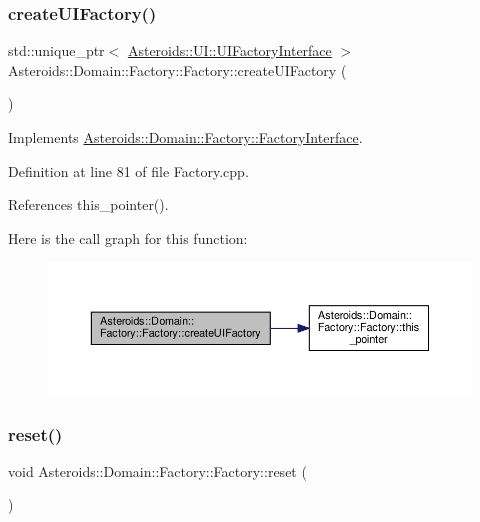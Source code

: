 \subsubsection{\texorpdfstring{create\+U\+I\+Factory()}{createUIFactory()}}
{\footnotesize\ttfamily std\+::unique\+\_\+ptr$<$ \hyperlink{classAsteroids_1_1UI_1_1UIFactoryInterface}{Asteroids\+::\+U\+I\+::\+U\+I\+Factory\+Interface} $>$ Asteroids\+::\+Domain\+::\+Factory\+::\+Factory\+::create\+U\+I\+Factory (\begin{DoxyParamCaption}{ }\end{DoxyParamCaption})\hspace{0.3cm}{\ttfamily [virtual]}}



Implements \hyperlink{classAsteroids_1_1Domain_1_1Factory_1_1FactoryInterface_a2576e64553a529bd6161acb3aea9d773}{Asteroids\+::\+Domain\+::\+Factory\+::\+Factory\+Interface}.



Definition at line 81 of file Factory.\+cpp.



References this\+\_\+pointer().

Here is the call graph for this function\+:\nopagebreak
\begin{figure}[H]
\begin{center}
\leavevmode
\includegraphics[width=350pt]{classAsteroids_1_1Domain_1_1Factory_1_1Factory_acb69fddf282eda975e582394dde7e7f6_cgraph}
\end{center}
\end{figure}
\mbox{\label{classAsteroids_1_1Domain_1_1Factory_1_1Factory_adf3c63ebcd2022de789631e861f2aa15}} 
\subsubsection{\texorpdfstring{reset()}{reset()}}
{\footnotesize\ttfamily void Asteroids\+::\+Domain\+::\+Factory\+::\+Factory\+::reset (\begin{DoxyParamCaption}{ }\end{DoxyParamCaption})}




